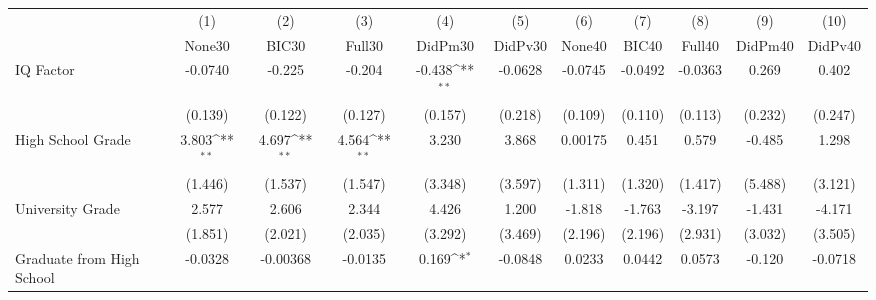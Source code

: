 {
\def\sym#1{\ifmmode^{#1}\else\(^{#1}\)\fi}
\begin{tabular}{l*{10}{c}}
\toprule
            &\multicolumn{1}{c}{(1)}&\multicolumn{1}{c}{(2)}&\multicolumn{1}{c}{(3)}&\multicolumn{1}{c}{(4)}&\multicolumn{1}{c}{(5)}&\multicolumn{1}{c}{(6)}&\multicolumn{1}{c}{(7)}&\multicolumn{1}{c}{(8)}&\multicolumn{1}{c}{(9)}&\multicolumn{1}{c}{(10)}\\
            &\multicolumn{1}{c}{None30}&\multicolumn{1}{c}{BIC30}&\multicolumn{1}{c}{Full30}&\multicolumn{1}{c}{DidPm30}&\multicolumn{1}{c}{DidPv30}&\multicolumn{1}{c}{None40}&\multicolumn{1}{c}{BIC40}&\multicolumn{1}{c}{Full40}&\multicolumn{1}{c}{DidPm40}&\multicolumn{1}{c}{DidPv40}\\
\midrule
IQ Factor   &     -0.0740         &      -0.225         &      -0.204         &      -0.438\sym{**} &     -0.0628         &     -0.0745         &     -0.0492         &     -0.0363         &       0.269         &       0.402         \\
            &     (0.139)         &     (0.122)         &     (0.127)         &     (0.157)         &     (0.218)         &     (0.109)         &     (0.110)         &     (0.113)         &     (0.232)         &     (0.247)         \\
\addlinespace
High School Grade&       3.803\sym{**} &       4.697\sym{**} &       4.564\sym{**} &       3.230         &       3.868         &     0.00175         &       0.451         &       0.579         &      -0.485         &       1.298         \\
            &     (1.446)         &     (1.537)         &     (1.547)         &     (3.348)         &     (3.597)         &     (1.311)         &     (1.320)         &     (1.417)         &     (5.488)         &     (3.121)         \\
\addlinespace
University Grade&       2.577         &       2.606         &       2.344         &       4.426         &       1.200         &      -1.818         &      -1.763         &      -3.197         &      -1.431         &      -4.171         \\
            &     (1.851)         &     (2.021)         &     (2.035)         &     (3.292)         &     (3.469)         &     (2.196)         &     (2.196)         &     (2.931)         &     (3.032)         &     (3.505)         \\
\addlinespace
Graduate from High School&     -0.0328         &    -0.00368         &     -0.0135         &       0.169\sym{*}  &     -0.0848         &      0.0233         &      0.0442         &      0.0573         &      -0.120         &     -0.0718         \\

\end{tabular}}
